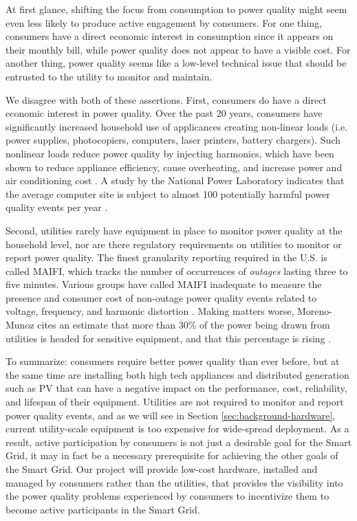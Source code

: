
At first glance, shifting the focus from consumption to power quality might seem even less likely to produce active engagement by consumers. For one thing, consumers have a direct economic interest in consumption since it appears on their monthly bill, while power quality does not appear to have a visible cost.  For another thing, power quality seems like a low-level technical issue that should be entrusted to the utility to monitor and maintain. 

We disagree with both of these assertions. First, consumers do have a direct economic interest in power quality. Over the past 20 years, consumers have significantly increased household use of applicances creating non-linear loads (i.e. power supplies, photocopiers, computers, laser printers, battery chargers). Such nonlinear loads reduce power quality by injecting harmonics, which have been shown to reduce appliance efficiency, cause overheating, and increase power and air conditioning cost \cite{Rodriguez2010}.  A study by the National Power Laboratory indicates that the average computer site is subject to almost 100 potentially harmful power quality events per year \cite{Dorr1992}.

Second, utilities rarely have equipment in place to monitor power quality at the household level, nor are there regulatory requirements on utilities to monitor or report power quality. The finest granularity reporting required in the U.S. is called MAIFI, which tracks the number of occurrences of {\em outages} lasting three to five minutes. Various groups have called MAIFI inadequate to measure the presence and consumer cost of non-outage power quality events related to voltage, frequency, and harmonic distortion \cite{Rouse2011,LaCommare2004,Eto2008}. Making matters worse, Moreno-Munoz cites an estimate that more than 30\% of the power being drawn from utilities is headed for sensitive equipment, and that this percentage is rising \cite{Moreno-Munoz2007}. 

To summarize: consumers require better power quality than ever before, but at the same time are installing both high tech appliances and distributed generation such as PV that can have a negative impact on the performance, cost, reliability, and lifespan of their equipment. Utilities are not required to monitor and report power quality events, and as we will see in Section \ref{sec:background-hardware}, current utility-scale equipment is too expensive for wide-spread deployment. As a result, active participation by consumers is not just a desirable goal for the Smart Grid, it may in fact be a necessary prerequisite for achieving the other goals of the Smart Grid. Our project will provide low-cost hardware, installed and managed by consumers rather than the utilities, that provides the visibility into the power quality problems experienced by consumers to incentivize them to become active participants in the Smart Grid.


